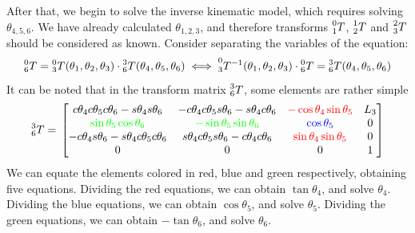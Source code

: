 \documentclass{article}
\begin{document}
After that, we begin to solve the inverse kinematic model, which requires solving $\theta_{4,5,6}$.
We have already calculated $\theta_{1,2,3}$, and therefore transforms $\prescript{0}{1}{T}$, $\prescript{1}{2}{T}$ and $\prescript{2}{3}{T}$ should be considered as known.
Consider separating the variables of the equation:
\[
    \prescript{0}{6}{T} = \prescript{0}{3}{T}(\theta_1, \theta_2, \theta_3) \cdot \prescript{3}{6}{T} (\theta_4, \theta_5, \theta_6)
    \iff
    \prescript{0}{3}{T^{-1}} (\theta_1, \theta_2, \theta_3) \cdot \prescript{0}{6}{T} = \prescript{3}{6}{T} (\theta_4, \theta_5, \theta_6)
\]
It can be noted that in the transform matrix $\prescript{3}{6}{T}$, some elements are rather simple
\[
    \prescript{3}{6}{T} = \\
    \begin{bmatrix}
        c{{{\theta }_4} } c{ {{\theta }_5} } c{ {{\theta }_6} }-s{ {{\theta }_4} } s{ {{\theta }_6} } &
        - c{ {{\theta }_4} } c{ {{\theta }_5} } s{ {{\theta }_6} } -s{ {{\theta }_4} } c{ {{\theta }_6} } &
        \textcolor{red}{- \cos\theta_4 \sin\theta_5 } &
        {L_3}\\
        \textcolor{green}{\sin{ {{\theta }_5} } \cos{ {{\theta }_6} }} &
        \textcolor{green}{- \sin{ {{\theta }_5} } \sin{ {{\theta }_6} }}  &
        \textcolor{blue}{\cos{ {{\theta }_5} }}
        & 0\\
        - c{{{\theta }_4}} s{ {{\theta }_6} } -s{ {{\theta }_4} } c{ {{\theta }_5} } c{ {{\theta }_6} } &
        s{ {{\theta }_4} } c{ {{\theta }_5} } s{ {{\theta }_6} }-c{ {{\theta }_4} } c{ {{\theta }_6} } &
        \textcolor{red}{ \sin\theta_4 \sin\theta_5} & 0\\
        0 & 0 & 0 & 1
    \end{bmatrix}
\]
We can equate the elements colored in red, blue and green respectively, obtaining five equations.
Dividing the red equations, we can obtain $\tan\theta_4$, and solve $\theta_4$.
Dividing the blue equations, we can obtain $\cos\theta_5$, and solve $\theta_5$.
Dividing the green equations, we can obtain $- \tan\theta_6$, and solve $\theta_6$.
\end{document}
